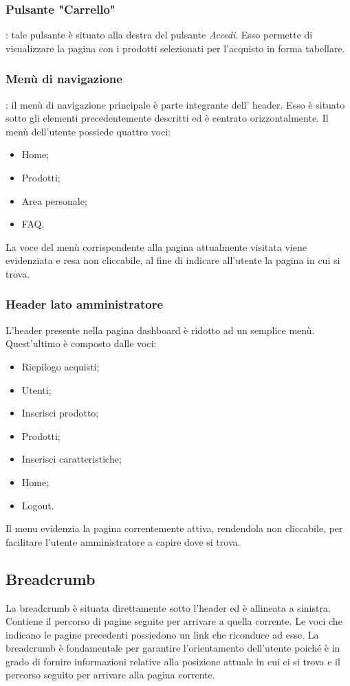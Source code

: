 \subsubsection{Pulsante "Carrello"}: tale pulsante è situato alla destra del pulsante \textit{Accedi}. Esso permette di visualizzare la pagina con i prodotti selezionati per l'acquisto in forma tabellare.

\subsubsection{Menù di navigazione}: il menù di navigazione principale è parte integrante dell' header. Esso è situato sotto gli elementi precedentemente descritti ed è centrato orizzontalmente. Il menù dell'utente possiede quattro voci:
\begin{itemize}
    \item Home;
    \item Prodotti;
    \item Area personale;
    \item FAQ.
\end{itemize}
La voce del menù corrispondente alla pagina attualmente visitata viene evidenziata e resa non cliccabile, al fine di indicare all'utente la pagina in cui si trova.

\subsubsection{Header lato amministratore}
L'header presente nella pagina dashboard è ridotto ad un semplice menù. Quest'ultimo è composto dalle voci:
\begin{itemize}
	\item Riepilogo acquisti;
	\item Utenti;
	\item Inserisci prodotto;
	\item Prodotti;
	\item Inserisci caratteristiche;
	\item Home;
	\item Logout.
\end{itemize}
Il menu evidenzia la pagina correntemente attiva, rendendola non cliccabile, per facilitare l'utente amministratore a capire dove si trova.

\subsection{Breadcrumb} 
La breadcrumb è situata direttamente sotto l'header ed è allineata a sinistra. Contiene il percorso di pagine seguite per arrivare a quella corrente. Le voci che indicano le pagine precedenti possiedono un link che riconduce ad esse. La breadcrumb è fondamentale per garantire l'orientamento dell'utente poiché è in grado di fornire informazioni relative alla posizione attuale in cui ci si trova e il percorso seguito per arrivare alla pagina corrente. 

